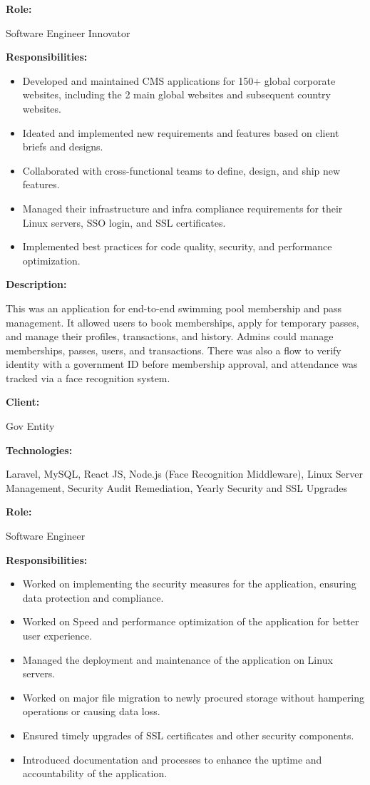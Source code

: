 \documentclass[letterpaper,10.5pt]{article}
\newcommand{\projLabel}[2]{%
  \vspace{6pt}{\small\bfseries\color{inkgray} Project #1: -- }{\bfseries #2}\par\vspace{3pt}
}
\newcommand{\fieldLabel}[1]{{\bfseries #1}\par}
\newcommand{\resumeItemListStart}{\begin{itemize}[nosep, itemsep=2pt, leftmargin=0.2in]}
\newcommand{\resumeItemListEnd}{\end{itemize}\vspace{1pt}}
\begin{document}
\fieldLabel{Role:}
\small Software Engineer Innovator
\vspace{4pt}

\fieldLabel{Responsibilities:}
\resumeItemListStart
\small\item Developed and maintained CMS applications for 150+ global corporate websites, including the 2 main global websites and subsequent country websites.
  \small\item Ideated and implemented new requirements and features based on client briefs and designs.
  \small\item Collaborated with cross-functional teams to define, design, and ship new features.
  \small\item Managed their infrastructure and infra compliance requirements for their Linux servers, SSO login, and SSL certificates.
  \small\item Implemented best practices for code quality, security, and performance optimization.
\resumeItemListEnd

\projLabel{3}{Swimming Pool Membership System}
\fieldLabel{Description:}
This was an application for end-to-end swimming pool membership and pass management. It allowed users to book memberships, apply for temporary passes, and manage their profiles, transactions, and history. Admins could manage memberships, passes, users, and transactions. There was also a flow to verify identity with a government ID before membership approval, and attendance was tracked via a face recognition system.
\small

\vspace{4pt}

\fieldLabel{Client:}
\small Gov Entity
\vspace{4pt}

\fieldLabel{Technologies:}
\small Laravel, MySQL, React JS, Node.js (Face Recognition Middleware), Linux Server Management, Security Audit Remediation, Yearly Security and SSL Upgrades
\vspace{4pt}

\fieldLabel{Role:}
\small Software Engineer
\vspace{4pt}

\fieldLabel{Responsibilities:}
\resumeItemListStart
  \small\item Worked on implementing the security measures for the application, ensuring data protection and compliance.
  \small\item Worked on Speed and performance optimization of the application for better user experience.
  \small\item Managed the deployment and maintenance of the application on Linux servers.
  \small\item Worked on major file migration to newly procured storage without hampering operations or causing data loss.
  \small\item Ensured timely upgrades of SSL certificates and other security components.
  \small\item Introduced documentation and processes to enhance the uptime and accountability of the application.
\resumeItemListEnd
\end{document}
